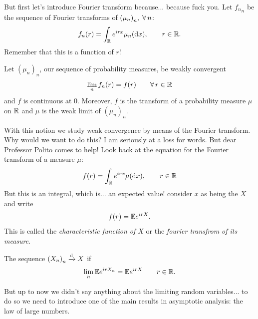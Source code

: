 \documentclass{report}
\begin{document}
But first let's introduce Fourier transform because... because fuck you. Let ${f_n}_{n}$ be the sequence of Fourier transforms of ${(\mu_{n})}_{n},\;\forall\, n$:
\[f_n(r)=\int_{\mathbb{R}}e^{irx}\mu_n(\mathop{}\!\mathrm{d} x),\qquad r\in\mathbb{R}.\]
Remember that this is a function of $r$!
\begin{theorem}
	Let ${(\mu_n)}_{n}$, our sequence of probability measures, be weakly convergent \ifonly{}
	\[\lim_n f_n(r)=f(r)\qquad\forall\, r\in\mathbb{R}\]
	and $f$ is continuous at 0. Moreover, $f$ is the transform of a probability measure $\mu$ on $\mathbb{R}$ and $\mu$ is the weak limit of ${(\mu_n)}_{n}$.
\end{theorem}
With this notion we study weak convergence by means of the Fourier transform. Why would we want to do this? I am seriously at a loss for words. But dear Professor Polito comes to help! Look back at the equation for the Fourier transform of a measure $\mu$:
\[f(r)=\int_{\mathbb{R}}e^{irx}\mu(\mathop{}\!\mathrm{d} x),\qquad r\in\mathbb{R}\]
But this is an integral, which is... an expected value! consider $x$ as being the \rv{} $X$ and write
\[f(r)=\mathbb{E} e^{irX}.\]
This is called the \emph{characteristic function of $X$} or the \emph{fourier transfrom of its measure}.
\begin{corollary}
	The sequence ${(X_n)}_{n}\xrightarrow[]{\text{d}} X$ if
	\[\lim_n\mathbb{E} e^{irX_{n}}=\mathbb{E} e^{irX}\qquad r\in\mathbb{R}.\] 
\end{corollary}
But up to now we didn't say anything about the limiting random variables... to do so we need to introduce one of the main results in asymptotic analysis: the law of large numbers.
\end{document}

